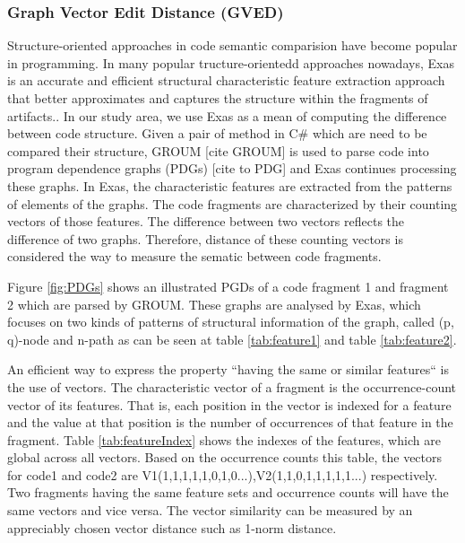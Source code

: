 \subsubsection{\textbf{Graph Vector Edit Distance (GVED)}} 
Structure-oriented approaches in code semantic comparision have become popular in programming. In many popular tructure-orientedd approaches nowadays, Exas is an accurate and efficient structural characteristic feature extraction approach that better approximates and captures the structure within the fragments of artifacts.\cite{Accurate and Efficient Structural Characteristic Feature Extraction for Clone Detection}.
In our study area, we use Exas as a mean of computing the difference between code structure. Given a pair of method in C\# which are need to be compared their structure, GROUM [cite GROUM] is used to parse code into program dependence graphs (PDGs) [cite to PDG] and Exas continues processing these graphs. In Exas, the characteristic features are extracted from the patterns of elements of the graphs. The code fragments are characterized by their counting vectors of those features. The difference between two vectors reflects the difference of two graphs.  Therefore, distance of these counting vectors is considered the way to measure the sematic between code fragments.



Figure \ref{fig:PDGs} shows an illustrated PGDs of a code fragment 1 and fragment 2 which are parsed by GROUM. These graphs are analysed by Exas, which focuses on two kinds of patterns of structural information of the graph, called (p, q)-node and n-path as can be seen at table \ref{tab:feature1} and table \ref{tab:feature2}. 

An efficient way to express the property ``having the same or similar features`` is the use of vectors. The characteristic vector of a fragment is the occurrence-count vector of its features. That is, each position in the vector is indexed for a feature and the value at that position is the number of occurrences of that feature in the fragment. Table \ref{tab:featureIndex} shows the indexes of the features, which are global across all vectors. Based on the occurrence counts this table, the vectors for code1 and code2 are V1(1,1,1,1,1,0,1,0...),V2(1,1,0,1,1,1,1,1...) respectively. Two fragments having the same feature sets and occurrence counts will have the same vectors and vice versa. The vector similarity can be measured by an appreciably chosen vector distance such as 1-norm distance.


